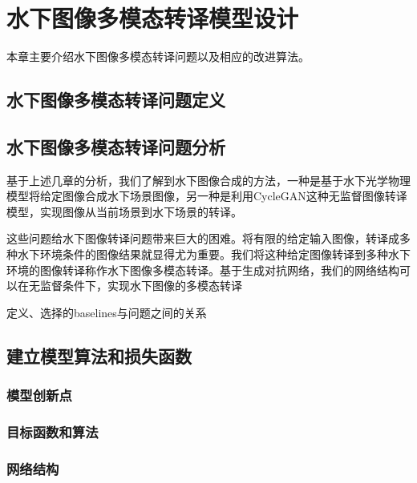 \chapter{水下图像多模态转译模型设计}
本章主要介绍水下图像多模态转译问题以及相应的改进算法。

\section{水下图像多模态转译问题定义}



\section{水下图像多模态转译问题分析}


基于上述几章的分析，我们了解到水下图像合成的方法，一种是基于水下光学物理模型将给定图像合成水下场景图像，另一种是利用CycleGAN这种无监督图像转译模型，实现图像从当前场景到水下场景的转译。

这些问题给水下图像转译问题带来巨大的困难。将有限的给定输入图像，转译成多种水下环境条件的图像结果就显得尤为重要。我们将这种给定图像转译到多种水下环境的图像转译称作水下图像多模态转译。基于生成对抗网络，我们的网络结构可以在无监督条件下，实现水下图像的多模态转译

定义、选择的baselines与问题之间的关系
\section{建立模型算法和损失函数}
\subsection{模型创新点}
\subsection{目标函数和算法}
\subsection{网络结构}

